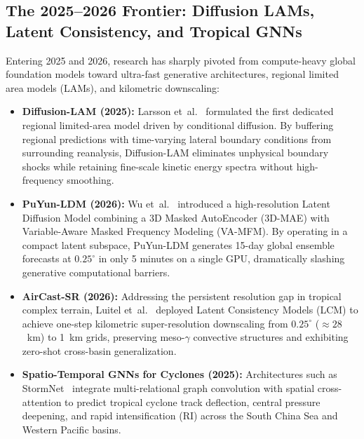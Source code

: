 \subsection{The 2025--2026 Frontier: Diffusion LAMs, Latent Consistency, and Tropical GNNs}
Entering 2025 and 2026, research has sharply pivoted from compute-heavy global foundation models toward ultra-fast generative architectures, regional limited area models (LAMs), and kilometric downscaling:
\begin{itemize}
    \item \textbf{Diffusion-LAM (2025):} Larsson et~al.~\cite{larsson2025diffusion_lam} formulated the first dedicated regional limited-area model driven by conditional diffusion. By buffering regional predictions with time-varying lateral boundary conditions from surrounding reanalysis, Diffusion-LAM eliminates unphysical boundary shocks while retaining fine-scale kinetic energy spectra without high-frequency smoothing.
    \item \textbf{PuYun-LDM (2026):} Wu et~al.~\cite{wu2026puyun_ldm} introduced a high-resolution Latent Diffusion Model combining a 3D Masked AutoEncoder (3D-MAE) with Variable-Aware Masked Frequency Modeling (VA-MFM). By operating in a compact latent subspace, PuYun-LDM generates 15-day global ensemble forecasts at $0.25^\circ$ in only 5 minutes on a single GPU, dramatically slashing generative computational barriers.
    \item \textbf{AirCast-SR (2026):} Addressing the persistent resolution gap in tropical complex terrain, Luitel et~al.~\cite{luitel2026aircast_sr} deployed Latent Consistency Models (LCM) to achieve one-step kilometric super-resolution downscaling from $0.25^\circ$ ($\approx 28$~km) to 1~km grids, preserving meso-$\gamma$ convective structures and exhibiting zero-shot cross-basin generalization.
    \item \textbf{Spatio-Temporal GNNs for Cyclones (2025):} Architectures such as StormNet~\cite{chen2025stormnet} integrate multi-relational graph convolution with spatial cross-attention to predict tropical cyclone track deflection, central pressure deepening, and rapid intensification (RI) across the South China Sea and Western Pacific basins.
\end{itemize}

